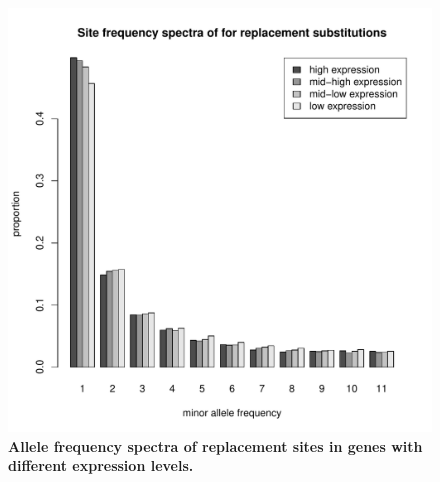 \begin{figure}[ht!]
      \centering
       \includegraphics[width=\linewidth]{Ch2FigS10}
    \caption{\textbf{Allele frequency spectra of replacement sites in genes with different expression levels.}}
    \label{fig:figS10}
\end{figure}

